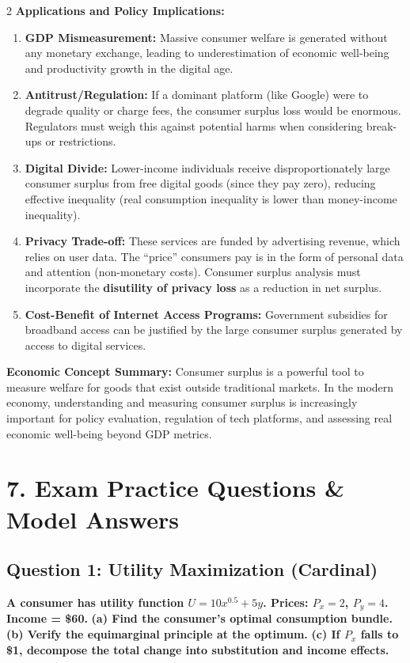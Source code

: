 \documentclass[10pt,a4paper]{article}
\begin{document}
\begin{multicols}{2}
\textbf{Applications and Policy Implications:}
\begin{enumerate}[leftmargin=*,nosep]
    \item \textbf{GDP Mismeasurement:} Massive consumer welfare is generated without any monetary exchange, leading to underestimation of economic well-being and productivity growth in the digital age.
    \item \textbf{Antitrust/Regulation:} If a dominant platform (like Google) were to degrade quality or charge fees, the consumer surplus loss would be enormous. Regulators must weigh this against potential harms when considering break-ups or restrictions.
    \item \textbf{Digital Divide:} Lower-income individuals receive disproportionately large consumer surplus from free digital goods (since they pay zero), reducing effective inequality (real consumption inequality is lower than money-income inequality).
    \item \textbf{Privacy Trade-off:} These services are funded by advertising revenue, which relies on user data. The ``price'' consumers pay is in the form of personal data and attention (non-monetary costs). Consumer surplus analysis must incorporate the \textbf{disutility of privacy loss} as a reduction in net surplus.
    \item \textbf{Cost-Benefit of Internet Access Programs:} Government subsidies for broadband access can be justified by the large consumer surplus generated by access to digital services.
\end{enumerate}

\textbf{Economic Concept Summary:} Consumer surplus is a powerful tool to measure welfare for goods that exist outside traditional markets. In the modern economy, understanding and measuring consumer surplus is increasingly important for policy evaluation, regulation of tech platforms, and assessing real economic well-being beyond GDP metrics.

\columnbreak

\section*{7. Exam Practice Questions \& Model Answers}

\subsection*{Question 1: Utility Maximization (Cardinal)}
\textbf{A consumer has utility function $U = 10x^{0.5} + 5y$. Prices: $P_x = 2$, $P_y = 4$. Income = \$60.}
\textbf{(a) Find the consumer's optimal consumption bundle.}
\textbf{(b) Verify the equimarginal principle at the optimum.}
\textbf{(c) If $P_x$ falls to \$1, decompose the total change into substitution and income effects.}


\end{multicols}
\end{document}
